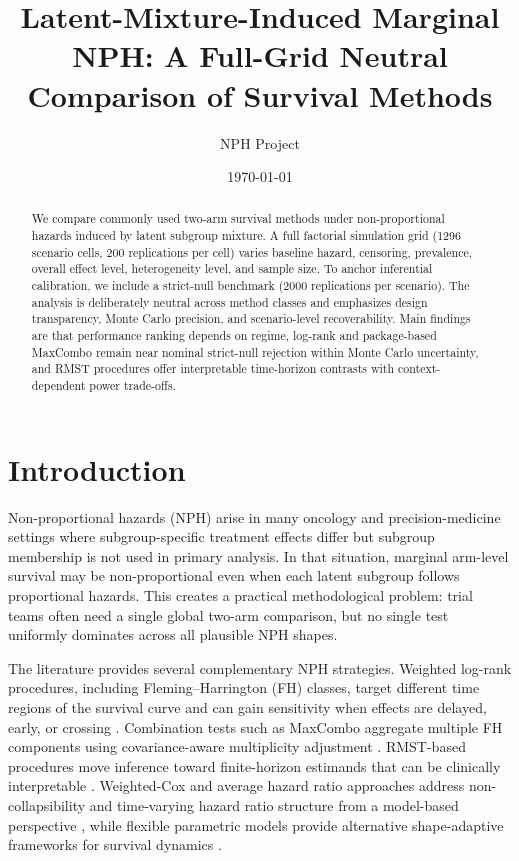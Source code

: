 \documentclass[11pt]{article}
\title{Latent-Mixture-Induced Marginal NPH: A Full-Grid Neutral Comparison of Survival Methods}
\author{NPH Project}
\date{\today}
\begin{document}
\maketitle

\begin{abstract}
We compare commonly used two-arm survival methods under non-proportional hazards induced by latent subgroup mixture. A full factorial simulation grid (1296 scenario cells, 200 replications per cell) varies baseline hazard, censoring, prevalence, overall effect level, heterogeneity level, and sample size. To anchor inferential calibration, we include a strict-null benchmark (2000 replications per scenario). The analysis is deliberately neutral across method classes and emphasizes design transparency, Monte Carlo precision, and scenario-level recoverability. Main findings are that performance ranking depends on regime, log-rank and package-based MaxCombo remain near nominal strict-null rejection within Monte Carlo uncertainty, and RMST procedures offer interpretable time-horizon contrasts with context-dependent power trade-offs.
\end{abstract}

\section{Introduction}
Non-proportional hazards (NPH) arise in many oncology and precision-medicine settings where subgroup-specific treatment effects differ but subgroup membership is not used in primary analysis. In that situation, marginal arm-level survival may be non-proportional even when each latent subgroup follows proportional hazards. This creates a practical methodological problem: trial teams often need a single global two-arm comparison, but no single test uniformly dominates across all plausible NPH shapes.

The literature provides several complementary NPH strategies. Weighted log-rank procedures, including Fleming--Harrington (FH) classes, target different time regions of the survival curve and can gain sensitivity when effects are delayed, early, or crossing \citep{harrington1982,fleming1991,magirr2019}. Combination tests such as MaxCombo aggregate multiple FH components using covariance-aware multiplicity adjustment \citep{ristl2021}. RMST-based procedures move inference toward finite-horizon estimands that can be clinically interpretable \citep{uno2014,cho2021}. Weighted-Cox and average hazard ratio approaches address non-collapsibility and time-varying hazard ratio structure from a model-based perspective \citep{schemper2009}, while flexible parametric models provide alternative shape-adaptive frameworks for survival dynamics \citep{royston2002}.
\end{document}
